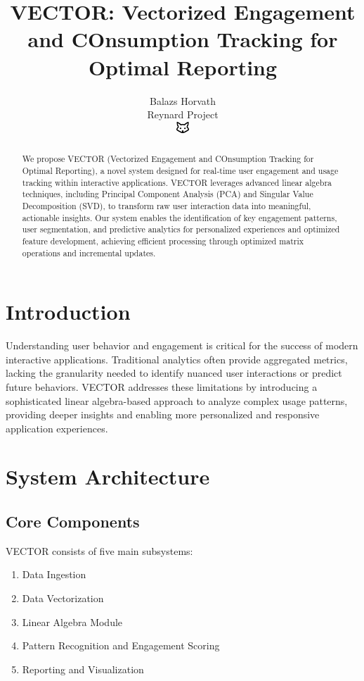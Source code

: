 \documentclass[10pt]{article}
\begin{document}
\title{VECTOR: Vectorized Engagement and COnsumption Tracking for Optimal Reporting}

\author{Balazs Horvath\\
Reynard Project\\
\includegraphics[width=0.5cm]{../../shared-assets/favicon.pdf}}

\maketitle

\begin{abstract}
We propose VECTOR (Vectorized Engagement and COnsumption Tracking for Optimal Reporting), a novel system designed for real-time user engagement and usage tracking within interactive applications. VECTOR leverages advanced linear algebra techniques, including Principal Component Analysis (PCA) and Singular Value Decomposition (SVD), to transform raw user interaction data into meaningful, actionable insights. Our system enables the identification of key engagement patterns, user segmentation, and predictive analytics for personalized experiences and optimized feature development, achieving efficient processing through optimized matrix operations and incremental updates.
\end{abstract}

\section{Introduction}
Understanding user behavior and engagement is critical for the success of modern interactive applications. Traditional analytics often provide aggregated metrics, lacking the granularity needed to identify nuanced user interactions or predict future behaviors. VECTOR addresses these limitations by introducing a sophisticated linear algebra-based approach to analyze complex usage patterns, providing deeper insights and enabling more personalized and responsive application experiences.

\section{System Architecture}
\subsection{Core Components}
VECTOR consists of five main subsystems:
\begin{enumerate}
    \item Data Ingestion
    \item Data Vectorization
    \item Linear Algebra Module
    \item Pattern Recognition and Engagement Scoring
    \item Reporting and Visualization
\end{enumerate}
\end{document}
